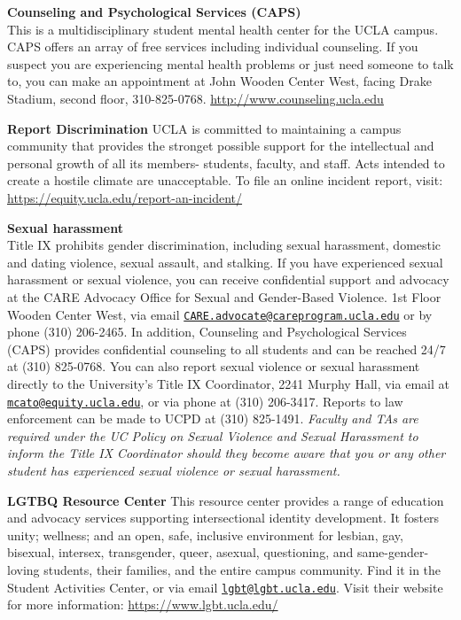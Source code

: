 \documentclass[11pt,]{article}
\begin{document}
\textbf{Counseling and Psychological Services (CAPS)}\\
This is a multidisciplinary student mental health center for the UCLA
campus. CAPS offers an array of free services including individual
counseling. If you suspect you are experiencing mental health problems
or just need someone to talk to, you can make an appointment at John
Wooden Center West, facing Drake Stadium, second floor, 310-825-0768.
\url{http://www.counseling.ucla.edu}

\textbf{Report Discrimination} UCLA is committed to maintaining a campus
community that provides the stronget possible support for the
intellectual and personal growth of all its members- students, faculty,
and staff. Acts intended to create a hostile climate are unacceptable.
To file an online incident report, visit:
\url{https://equity.ucla.edu/report-an-incident/}

\textbf{Sexual harassment}\\
Title IX prohibits gender discrimination, including sexual harassment,
domestic and dating violence, sexual assault, and stalking. If you have
experienced sexual harassment or sexual violence, you can receive
confidential support and advocacy at the CARE Advocacy Office for Sexual
and Gender-Based Violence. 1st Floor Wooden Center West, via email
\href{mailto:CARE.advocate@careprogram.ucla.edu}{\nolinkurl{CARE.advocate@careprogram.ucla.edu}}
or by phone (310) 206-2465. In addition, Counseling and Psychological
Services (CAPS) provides confidential counseling to all students and can
be reached 24/7 at (310) 825-0768. You can also report sexual violence
or sexual harassment directly to the University's Title IX Coordinator,
2241 Murphy Hall, via email at
\href{mailto:mcato@equity.ucla.edu}{\nolinkurl{mcato@equity.ucla.edu}},
or via phone at (310) 206-3417. Reports to law enforcement can be made
to UCPD at (310) 825-1491. \emph{Faculty and TAs are required under the
UC Policy on Sexual Violence and Sexual Harassment to inform the Title
IX Coordinator should they become aware that you or any other student
has experienced sexual violence or sexual harassment.}

\textbf{LGTBQ Resource Center} This resource center provides a range of
education and advocacy services supporting intersectional identity
development. It fosters unity; wellness; and an open, safe, inclusive
environment for lesbian, gay, bisexual, intersex, transgender, queer,
asexual, questioning, and same-gender-loving students, their families,
and the entire campus community. Find it in the Student Activities
Center, or via email
\href{mailto:lgbt@lgbt.ucla.edu}{\nolinkurl{lgbt@lgbt.ucla.edu}}. Visit
their website for more information: \url{https://www.lgbt.ucla.edu/}
\end{document}
